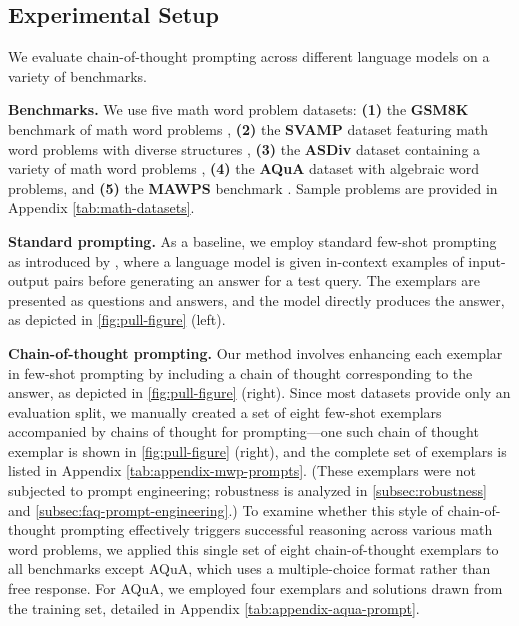 \subsection{Experimental Setup}

We evaluate chain-of-thought prompting across different language models on a variety of benchmarks.

\textbf{Benchmarks.}
We use five math word problem datasets:
\textbf{(1)} the \textbf{GSM8K} benchmark of math word problems \citep{cobbe2021training}, 
\textbf{(2)} the \textbf{SVAMP} dataset featuring math word problems with diverse structures \citep{patel-etal-2021-nlp},
\textbf{(3)} the \textbf{ASDiv} dataset containing a variety of math word problems \citep{miao-etal-2020-diverse},
\textbf{(4)} the \textbf{AQuA} dataset with algebraic word problems, and
\textbf{(5)} the \textbf{MAWPS} benchmark \citep{koncel-kedziorski-etal-2016-mawps}. Sample problems are provided in Appendix \cref{tab:math-datasets}.

\textbf{Standard prompting.} As a baseline, we employ standard few-shot prompting as introduced by \citet{brown2020language}, where a language model is given in-context examples of input-output pairs before generating an answer for a test query. The exemplars are presented as questions and answers, and the model directly produces the answer, as depicted in \cref{fig:pull-figure} (left).

\textbf{Chain-of-thought prompting.} Our method involves enhancing each exemplar in few-shot prompting by including a chain of thought corresponding to the answer, as depicted in \cref{fig:pull-figure} (right). Since most datasets provide only an evaluation split, we manually created a set of eight few-shot exemplars accompanied by chains of thought for prompting—one such chain of thought exemplar is shown in \cref{fig:pull-figure} (right), and the complete set of exemplars is listed in Appendix \cref{tab:appendix-mwp-prompts}. (These exemplars were not subjected to prompt engineering; robustness is analyzed in \cref{subsec:robustness} and \cref{subsec:faq-prompt-engineering}.) To examine whether this style of chain-of-thought prompting effectively triggers successful reasoning across various math word problems, we applied this single set of eight chain-of-thought exemplars to all benchmarks except AQuA, which uses a multiple-choice format rather than free response. For AQuA, we employed four exemplars and solutions drawn from the training set, detailed in Appendix \cref{tab:appendix-aqua-prompt}.


